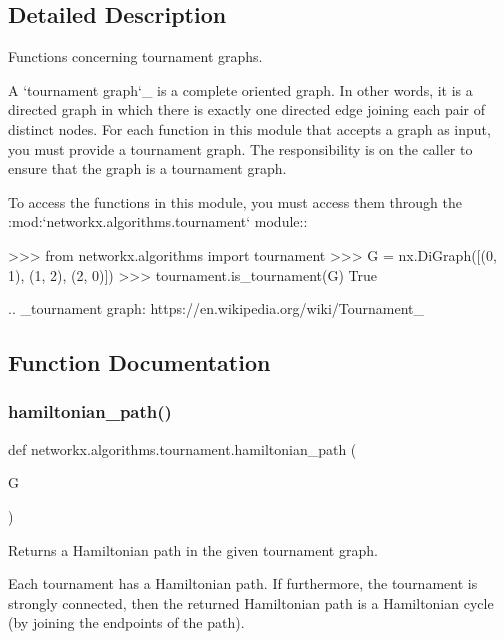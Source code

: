 \subsection{Detailed Description}
\begin{DoxyVerb}Functions concerning tournament graphs.

A `tournament graph`_ is a complete oriented graph. In other words, it
is a directed graph in which there is exactly one directed edge joining
each pair of distinct nodes. For each function in this module that
accepts a graph as input, you must provide a tournament graph. The
responsibility is on the caller to ensure that the graph is a tournament
graph.

To access the functions in this module, you must access them through the
:mod:`networkx.algorithms.tournament` module::

>>> from networkx.algorithms import tournament
>>> G = nx.DiGraph([(0, 1), (1, 2), (2, 0)])
>>> tournament.is_tournament(G)
True

.. _tournament graph: https://en.wikipedia.org/wiki/Tournament_%
 

\subsection{Function Documentation}
\mbox{\label{namespacenetworkx_1_1algorithms_1_1tournament_afddc5b951e3fc5c0c168ccc59d22dc13}} 
\subsubsection{\texorpdfstring{hamiltonian\+\_\+path()}{hamiltonian\_path()}}
{\footnotesize\ttfamily def networkx.\+algorithms.\+tournament.\+hamiltonian\+\_\+path (\begin{DoxyParamCaption}\item[{}]{G }\end{DoxyParamCaption})}

\begin{DoxyVerb}Returns a Hamiltonian path in the given tournament graph.

Each tournament has a Hamiltonian path. If furthermore, the
tournament is strongly connected, then the returned Hamiltonian path
is a Hamiltonian cycle (by joining the endpoints of the path).


\end{DoxyVerb}
\end{DoxyVerb}
